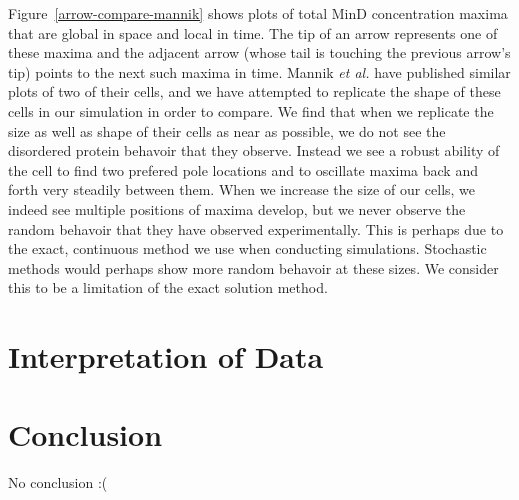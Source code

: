 \documentclass[letterpaper,twocolumn,amsmath,amssymb,pre]{revtex4-1}
\begin{document}
Figure~\ref{arrow-compare-mannik} shows plots of total MinD
concentration maxima that are global in space and local in time.  The
tip of an arrow represents one of these maxima and the adjacent arrow
(whose tail is touching the previous arrow's tip) points to the next
such maxima in time.  Mannik \emph{et al.} have published similar
plots of two of their cells, and we have attempted to replicate the
shape of these cells in our simulation in order to compare.  We find
that when we replicate the size as well as shape of their cells as
near as possible, we do not see the disordered protein behavoir that
they observe.  Instead we see a robust ability of the cell to find two
prefered pole locations and to oscillate maxima back and forth very
steadily between them.  When we increase the size of our cells, we
indeed see multiple positions of maxima develop, but we never observe
the random behavoir that they have observed experimentally.  This is
perhaps due to the exact, continuous method we use when conducting
simulations.  Stochastic methods would perhaps show more random
behavoir at these sizes.  We consider this to be a limitation of the
exact solution method.



\section{Interpretation of Data}
\section{Conclusion}
No conclusion :(

\end{document}
